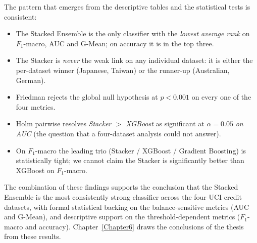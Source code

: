 The pattern that emerges from the descriptive tables and the
statistical tests is consistent:

\begin{itemize}
 \item The Stacked Ensemble is the only classifier with the
 \emph{lowest average rank} on $F_1$-macro, AUC and G-Mean;
 on accuracy it is in the top three.
 \item The Stacker is \emph{never} the weak link on any individual
 dataset: it is either the per-dataset winner (Japanese,
 Taiwan) or the runner-up (Australian, German).
 \item Friedman rejects the global null hypothesis at $p<0.001$
 on every one of the four metrics.
 \item Holm pairwise resolves \emph{Stacker $>$ XGBoost} as
 significant at $\alpha=0.05$ \emph{on AUC} (the question that
 a four-dataset analysis could not answer).
 \item On $F_1$-macro the leading trio (Stacker / XGBoost /
 Gradient Boosting) is statistically tight; we cannot claim
 the Stacker is significantly better than XGBoost on
 $F_1$-macro.
\end{itemize}

The combination of these findings supports the conclusion that the
Stacked Ensemble is the most consistently strong classifier across
the four UCI credit datasets, with formal statistical backing on
the balance-sensitive metrics (AUC and G-Mean), and descriptive
support on the threshold-dependent metrics ($F_1$-macro and
accuracy). Chapter~\ref{Chapter6} draws the conclusions of the
thesis from these results.
